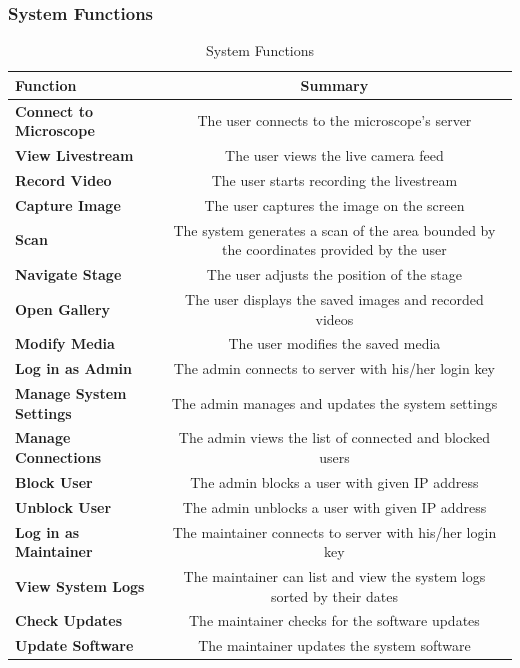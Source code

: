 \subsubsection{System Functions}
\begin{table}[H]
	\centering
	\begin{tabular}{|l|C|}
		\hline
		\textbf{Function}   &  \textbf{Summary}\\
		\hline
		\textbf{Connect to Microscope}   &  The user connects to the microscope's server\\
		\hline
		\textbf{View Livestream}   &  The user views the live camera feed\\
		\hline
		\textbf{Record Video}   &  The user starts recording the livestream\\
		\hline
		\textbf{Capture Image}   &  The user captures the image on the screen\\
		\hline
		\textbf{Scan}   &  The system generates a scan of the area bounded by the coordinates provided by the user\\
		\hline
		\textbf{Navigate Stage}   &  The user adjusts the position of the stage\\
		\hline
		\textbf{Open Gallery}   &  The user displays the saved images and recorded videos\\
		\hline
		\textbf{Modify Media}   &  The user modifies the saved media\\
		\hline
		\textbf{Log in as Admin}   &  The admin connects to server with his/her login key\\
		\hline
		\textbf{Manage System Settings}   &  The admin manages and updates the system settings\\
		\hline
		\textbf{Manage Connections}   &  The admin views the list of connected and blocked users\\
		\hline
		\textbf{Block User}   &  The admin blocks a user with given IP address\\
		\hline
		\textbf{Unblock User}   &  The admin unblocks a user with given IP address\\
		\hline
		\textbf{Log in as Maintainer}   &  The maintainer connects to server with his/her login key\\
		\hline
		\textbf{View System Logs}   &  The maintainer can list and view the system logs sorted by their dates\\
		\hline
		\textbf{Check Updates}   &  The maintainer checks for the software updates\\
		\hline
		\textbf{Update Software}   & The maintainer updates the system software \\
		\hline
	\end{tabular}
	\caption{System Functions}
	\label{tab:system_functions}
\end{table}


